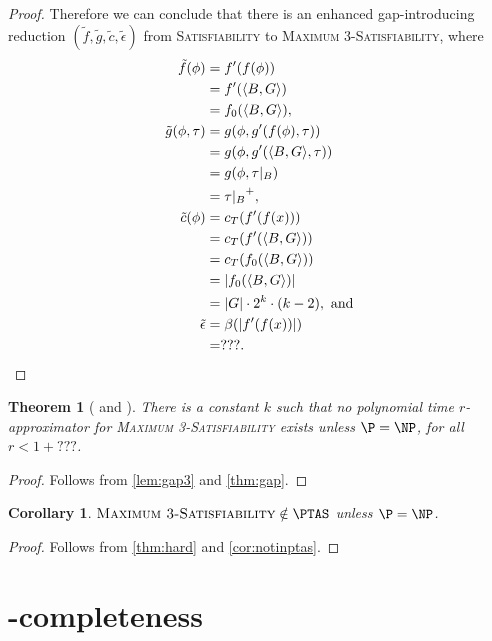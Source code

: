 \documentclass[]{article}
\theoremstyle{plain}
\newtheorem{corollary}{Corollary}
\newtheorem{theorem}{Theorem}
\theoremstyle{definition}
\newcommand{\pair}[2]{{\left\langle{#1}, {#2}\right\rangle}}
\begin{document}
\begin{proof}
  Therefore we can conclude that there is an enhanced gap-introducing reduction $(\tilde{f}, \tilde{g}, \tilde{c}, \tilde{\epsilon})$ from \textsc{Satisfiability} to \textsc{Maximum 3-Satisfiability}, where
  \begin{align*}
    \tilde{f}(\phi) & = f'(f(\phi)) \\
    & = f'(\pair{B}{G}) \\
    & = f_0(\pair{B}{G}), \\
    \tilde{g}(\phi, \tau) & = g(\phi, g'(f(\phi), \tau)) \\
    & = g(\phi, g'(\pair{B}{G}, \tau)) \\
    & = g(\phi, \tau|_B) \\
    & = {\tau|_B}^+, \\
    \tilde{c}(\phi) & = c_T(f'(f(x))) \\
    & = c_T(f'(\pair{B}{G})) \\
    & = c_T(f_0(\pair{B}{G})) \\
    & = |f_0(\pair{B}{G})| \\
    & = |G| \cdot 2^k \cdot (k - 2), \text{ and} \\
    \tilde{\epsilon} & = \beta(|f'(f(x))|) \\
    & = ???. \qedhere
  \end{align*}
\end{proof}

\begin{theorem}[{\cite[Theorem~6.3]{book}} and {\cite[Corollary~29.8]{vazirani}}]\label{thm:hard}
  There is a constant $k$ such that no polynomial time $r$-approximator for \textsc{Maximum 3-Satisfiability} exists unless $\P = \NP$, for all $r < 1 + ???$.
\end{theorem}
\begin{proof}
  Follows from \autoref{lem:gap3} and \autoref{thm:gap}.
\end{proof}

\begin{corollary}
  $\textsc{Maximum 3-Satisfiability} \notin \PTAS$ unless $\P = \NP$.
\end{corollary}
\begin{proof}
  Follows from \autoref{thm:hard} and \autoref{cor:notinptas}.
\end{proof}

\section{\texorpdfstring{\APX}{APX}-completeness}
\end{document}
